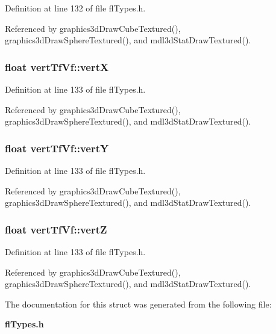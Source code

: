 Definition at line 132 of file fl\-Types.h.

Referenced by graphics3d\-Draw\-Cube\-Textured(), graphics3d\-Draw\-Sphere\-Textured(), and mdl3d\-Stat\-Draw\-Textured().
\subsubsection{\setlength{\rightskip}{0pt plus 5cm}float {\bf vert\-Tf\-Vf::vert\-X}}\label{structvertTfVf_e68eb9dbb46e48709ec42157b94c967f}




Definition at line 133 of file fl\-Types.h.

Referenced by graphics3d\-Draw\-Cube\-Textured(), graphics3d\-Draw\-Sphere\-Textured(), and mdl3d\-Stat\-Draw\-Textured().
\subsubsection{\setlength{\rightskip}{0pt plus 5cm}float {\bf vert\-Tf\-Vf::vert\-Y}}\label{structvertTfVf_68380125f20af091c8970c1278fc489a}




Definition at line 133 of file fl\-Types.h.

Referenced by graphics3d\-Draw\-Cube\-Textured(), graphics3d\-Draw\-Sphere\-Textured(), and mdl3d\-Stat\-Draw\-Textured().
\subsubsection{\setlength{\rightskip}{0pt plus 5cm}float {\bf vert\-Tf\-Vf::vert\-Z}}\label{structvertTfVf_9e8008344b11e35e363c1d6844e8e92b}




Definition at line 133 of file fl\-Types.h.

Referenced by graphics3d\-Draw\-Cube\-Textured(), graphics3d\-Draw\-Sphere\-Textured(), and mdl3d\-Stat\-Draw\-Textured().

The documentation for this struct was generated from the following file:\begin{CompactItemize}
\item 
{\bf fl\-Types.h}\end{CompactItemize}
